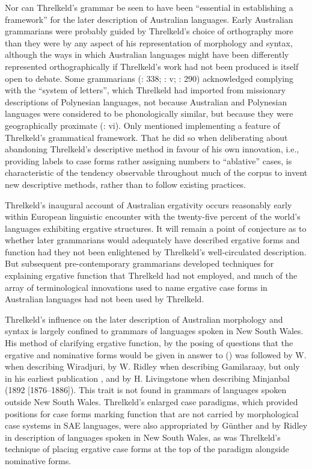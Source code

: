 Nor can Threlkeld’s grammar be seen to have been “essential in establishing a framework” \citep[269]{carey_lancelot_2004} for the later description of Australian languages. Early Australian grammarians were probably guided by Threlkeld’s choice of orthography more than they were by any aspect of his representation of morphology and syntax, although the ways in which Australian languages might have been differently represented orthographically if Threlkeld’s work had not been produced is itself open to debate. Some grammarians (\citealt{gunther_lecture_1840}: 338; \citealt{teichelmann_outlines_1840}: v; \citealt{ridley_kamilaroi_1856}: 290) acknowledged complying with the “system of letters'', which Threlkeld had imported from missionary descriptions of Polynesian languages, not because Australian and Polynesian languages were considered to be phonologically similar, but because they were geographically proximate (\citealt{threlkeld_australian_1834}: vi). Only \citet{gunther_native_1838} mentioned implementing a feature of Threlkeld’s grammatical framework. That he did so when deliberating about abandoning Threlkeld’s descriptive method in favour of his own innovation, i.e., providing labels to case forms rather assigning numbers to “ablative” cases, is characteristic of the tendency observable throughout much of the corpus to invent new descriptive methods, rather than to follow existing practices.

Threlkeld’s inaugural account of Australian ergativity \citeyearpar{threlkeld_australian_1834} occurs reasonably early within European linguistic encounter with the twenty-five percent of the world’s languages exhibiting ergative structures. It will remain a point of conjecture as to whether later grammarians would adequately have described ergative forms and function had they not been enlightened by Threlkeld’s well-cir\-culated description. But subsequent pre-contemporary grammarians developed techniques for explaining ergative function that Threlkeld had not employed, and much of the array of terminological innovations used to name ergative case forms in Australian languages had not been used by Threlkeld.

Threlkeld’s influence on the later description of Australian morphology and syntax is largely confined to grammars of languages spoken in New South Wales. His method of clarifying ergative function, by the posing of questions that the ergative and nominative forms would be given in answer to () was followed by W. \citet{gunther_native_1838} when describing Wiradjuri, by W. Ridley when describing Gamilaraay, but only in his earliest publication \citeyearpar{ridley_kamilaroi_1856}, and by H. Livingstone when describing Minjanbal (1892 [1876--1886]). This trait is not found in grammars of languages spoken outside New South Wales. Threlkeld’s enlarged case paradigms, which provided positions for case forms marking function that are not carried by morphological case systems in SAE languages, were also appropriated by Günther and by Ridley in description of languages spoken in New South Wales, as was Threlkeld’s technique of placing ergative case forms at the top of the paradigm alongside nominative forms.

